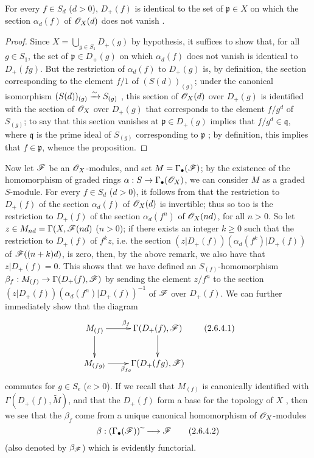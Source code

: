\begin{proposition}[2.6.3]
\label{II.2.6.3}
For every $f\in S_d$ ($d>0$), $D_+(f)$ is identical to the set of $\mathfrak{p}\in X$ on which the section $\alpha_d(f)$ of $\mathscr{O}_X(d)$ does not vanish .
\end{proposition}

\begin{proof}
Since $X=\bigcup_{g\in S_1}D_+(g)$ by hypothesis, it suffices to show that, for all $g\in S_1$, the set of $\mathfrak{p}\in D_+(g)$ on which $\alpha_d(f)$ does not vanish is identical to $D_+(fg)$.
But the restriction of $\alpha_d(f)$ to $D_+(g)$ is, by definition, the section corresponding to the element $f/1$ of $(S(d))_{(g)}$;
under the canonical isomorphism $(S(d))_{(g)}\xrightarrow{\sim} S_{(g)}$ , this section of $\mathscr{O}_X(d)$ over $D_+(g)$ is identified with the section of $\mathscr{O}_X$ over $D_+(g)$ that corresponds to the element $f/g^d$ of $S_{(g)}$;
to say that this section vanishes at $\mathfrak{p}\in D_+(g)$ implies that $f/g^d\in\mathfrak{q}$, where $\mathfrak{q}$ is the prime ideal of $S_{(g)}$ corresponding to $\mathfrak{p}$ ;
by definition, this implies that $f\in\mathfrak{p}$, whence the proposition.
\end{proof}

\begin{env}[2.4.6]
\label{II.2.4.6}
Now let $\mathscr{F}$ be an $\mathscr{O}_X$-modules, and set $M=\Gamma_\bullet(\mathscr{F})$;
by the existence of the homomorphism of graded rings $\alpha: S\to\Gamma_\bullet(\sh{O}_X)$, we can consider $M$ as a graded $S$-module.
For every $f\in S_d$ ($d>0$), it follows from  that the restriction to $D_+(f)$ of the section $\alpha_d(f)$ of $\mathscr{O}_X(d)$ is invertible;
thus so too is the restriction to $D_+(f)$ of the section $\alpha_d(f^n)$ of $\mathscr{O}_X(nd)$, for all $n>0$.
So let $z\in M_{nd}=\Gamma(X,\mathscr{F}(nd)$ ($n>0$);
if there exists an integer $k\geq0$ such that the restriction to $D_+(f)$ of $f^kz$, i.e. the
section $(z|D_+(f))(\alpha_d(f^k)|D_+(f))$ of $\mathscr{F}((n+k)d)$, is zero, then, by the above remark, we also have that $z|D_+(f)=0$.
This shows that we have defined an $S_{(f)}$-homomorphism $\beta_f: M_{(f)}\to\Gamma(D_+(f),\sh{F})$ by sending the element $z/f^n$ to the section $(z|D_+(f))(\alpha_d(f^n)|D_+(f))^{-1}$ of $\mathscr{F}$ over $D_+(f)$.
We can further immediately show that the diagram
\[
\label{II.2.6.4.1}
  \xymatrix{
    M_{(f)} \ar[r]^{\beta_f} \ar[d]
    & \Gamma(D_+(f),\sh{F}) \ar[d]
  \\M_{(fg)} \ar[r]_{\beta_{fg}}
    & \Gamma(D_+(fg),\sh{F})
  }
\tag{2.6.4.1}
\]
commutes for $g\in S_e$ ($e>0$).
If we recall that $M_{(f)}$ is canonically identified with $\Gamma(D_+(f),\widetilde{M})$, and that the $D_+(f)$ form a base for the topology of $X$ , then we see that the $\beta_f$ come from a unique canonical homomorphism of $\mathscr{O}_X$-modules
\[
\label{II.2.6.4.2}
  \beta:(\Gamma_\bullet(\sh{F}))\supertilde\to\sh{F}
\tag{2.6.4.2}
\]
(also denoted by $\beta_{\mathscr{F}}$) which is evidently functorial.
\end{env}

